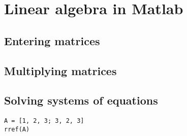 \section{Linear algebra in Matlab}

\subsection{Entering matrices}

\subsection{Multiplying matrices}

\subsection{Solving systems of equations}

\begin{lstlisting}
A = [1, 2, 3; 3, 2, 3]
rref(A)
\end{lstlisting}



